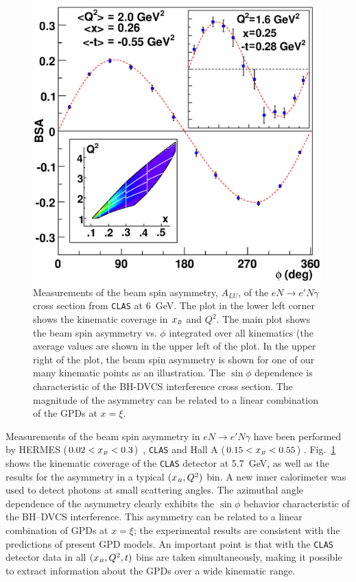 \begin{figure}[ht]
\includegraphics[width=0.99\textwidth]{../der/WP_CLAS_ALU.eps}
\caption{\small{Measurements of the beam spin asymmetry, $A_{LU}$, of the 
$eN \to e'N\gamma$ cross section from {\tt CLAS} at 6~GeV.  The plot in
the lower left corner shows the kinematic coverage in $x_{\scriptscriptstyle B}$ and $Q^2$.
The main plot shows the beam spin asymmetry vs. $\phi$ integrated over all
kinematics (the average values are shown in the upper left of the plot.  In
the upper right of the plot, the beam spin asymmetry is shown for one of
our many kinematic points as an illustration.  The $\sin \phi$ dependence 
is characteristic of the BH-DVCS interference cross section.  The magnitude 
of the asymmetry can be related to a linear combination of the GPDs 
at $x = \xi$.}}
\label{fig:CLAS_e1}
\end{figure}

Measurements of the beam spin asymmetry in $eN \to e'N\gamma$ have been 
performed by HERMES ($0.02 < x_{\scriptscriptstyle B} < 0.3$)~\cite{Airapetian:2001yk}, {\tt CLAS}
\cite{Stepanyan:2001sm,JLabExp:E01-113} and Hall A ($0.15 < x_{\scriptscriptstyle B} < 0.55$)
\cite{JLabExp:E00-110}.  Fig.~\ref{fig:CLAS_e1} shows the kinematic coverage 
of the {\tt CLAS} detector at 5.7~GeV, as well as the results for the 
asymmetry in a typical $(x_{\scriptscriptstyle B}, Q^2)$ bin.  A new inner calorimeter was used 
to detect photons at small scattering angles.  The azimuthal angle dependence 
of the asymmetry clearly exhibits the $\sin\phi$ behavior characteristic
of the BH--DVCS interference. This asymmetry can be related to a linear 
combination of GPDs at $x = \xi$; the experimental results are consistent 
with the predictions of present GPD models. An important point is that with 
the {\tt CLAS} detector data in all $(x_{\scriptscriptstyle B}, Q^2, t)$ bins are taken 
simultaneously, making it possible to extract information about the GPDs 
over a wide kinematic range.


